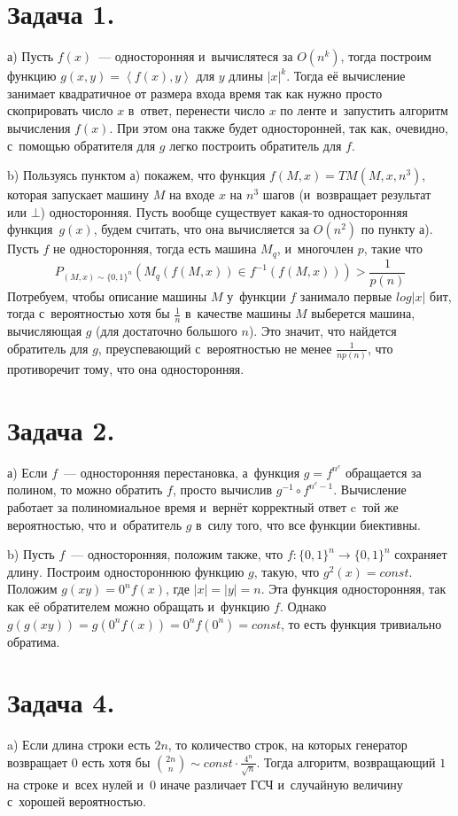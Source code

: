 \documentclass{article}
\begin{document}
\section*{Задача 1.}
а) Пусть $f(x)$~--- односторонняя и~вычислятеся за $O(n^k)$, тогда построим
функцию $g(x,y) = \left<f(x), y\right>$ для $y$ длины $|x|^k$.
Тогда её вычисление занимает квадратичное от размера входа время так как нужно
просто скоприровать число $x$ в~ответ, перенести число $x$ по ленте и~запустить
алгоритм вычисления $f(x)$. При этом она также будет односторонней, так
как, очевидно, с~помощью обратителя для $g$ легко построить обратитель для $f$.

b) Пользуясь пунктом а) покажем, что функция $f(M,x) = TM(M, x, n^3)$, которая
запускает машину $M$ на входе $x$ на $n^3$ шагов (и~возвращает результат или
$\bot$) односторонняя. Пусть вообще существует какая-то односторонняя
функция~$g(x)$, будем считать, что она вычисляется за $O(n^2)$ по пункту а).
Пусть $f$ не односторонняя, тогда есть машина $M_q$, и~многочлен $p$, такие что
$$P_{(M,x)\sim \{0,1\}^n}(M_q(f(M, x)) \in f^{-1}(f(M,x))) > \frac{1}{p(n)}$$
Потребуем, чтобы описание машины $M$ у~функции $f$ занимало первые $log|x|$ бит,
тогда с~вероятностью хотя бы $\frac{1}{n}$ в~качестве машины $M$ выберется
машина, вычисляющая $g$ (для достаточно большого $n$). Это значит, что найдется
обратитель для $g$, преуспевающий с~вероятностью не менее $\frac{1}{np(n)}$, что
противоречит тому, что она односторонняя.

\section*{Задача 2.}
а) Если $f$~--- односторонняя перестановка, а~функция $g = f^{n^c}$ обращается
за полином, то можно обратить $f$, просто вычислив $g^{-1} \circ f^{n^c - 1}$.
Вычисление работает за полиномиальное время и~вернёт корректный ответ c~той же
вероятностью, что и~обратитель $g$ в~силу того, что все функции биективны.

b) Пусть $f$~--- односторонняя, положим также, что $f: \{0,1\}^{n} \rightarrow
\{0,1\}^{n}$ сохраняет длину. Построим одностороннюю функцию $g$, такую, что
$g^2(x) = const$. Положим $g(xy) = 0^{n} f(x)$, где $\left|x\right| =
\left|y\right| = n$.  Эта функция односторонняя, так как её обратителем можно
обращать и~функцию $f$. Однако $g(g(xy)) = g(0^nf(x))= 0^n f(0^n) = const$, то
есть функция тривиально обратима.

\section*{Задача 4.}
a) Если длина строки есть $2n$, то количество строк, на которых генератор
возвращает $0$ есть хотя бы ${2n \choose n} \sim const \cdot
\frac{4^n}{\sqrt{n}}$. Тогда алгоритм, возвращающий $1$ на строке и~всех нулей
и~$0$ иначе различает ГСЧ и~случайную величину с~хорошей вероятностью.
\end{document}
